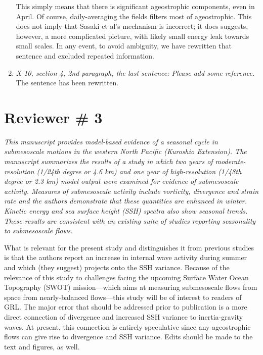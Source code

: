 \documentclass[11pt]{article}
\newcommand{\bdp}{\begin{description}}
\newcommand{\edp}{\end{description}}
\begin{document}
\begin{enumerate}
          \bdp
              This simply means that there is significant ageostrophic components,
              even in April. Of course, daily-averaging the fields filters most of
              ageostrophic. This does not imply that Sasaki et al's mechanism is
              incorrect; it does suggests, however, a more complicated picture, with
              likely small energy leak towards small scales. In any event, to avoid ambiguity, we
              have rewritten that sentence and excluded repeated information.
          \edp

  \item {\it X-10, section 4, 2nd paragraph, the last sentence: Please add some reference.}
          The sentence has been rewritten.
\end{enumerate}


\section{Reviewer \# 3}
        {\it This manuscript provides model-based evidence of a seasonal cycle in submesoscale motions
         in the western North Pacific (Kuroshio Extension). The manuscript summarizes the results of
         a study in which two years of moderate-resolution (1/24th degree or 4.6 km) and one year of
         high-resolution (1/48th degree or 2.3 km) model output were examined for evidence of
         submesoscale activity. Measures of submesoscale activity include vorticity, divergence and
         strain rate and the authors demonstrate that these quantities are enhanced in winter. Kinetic
         energy and sea surface height (SSH) spectra also show seasonal trends. These results are
         consistent with an existing suite of studies reporting seasonality to submesoscale flows.

         What is relevant for the present study and distinguishes it from previous studies is that the
         authors report an increase in internal wave activity during summer and which (they suggest)
         projects onto the SSH variance. Because of the relevance of this study to challenges facing
         the upcoming Surface Water Ocean Topography (SWOT) mission—which aims at measuring
         submesoscale flows from space from nearly-balanced flows—this study will be of interest to
         readers of GRL. The major error that should be addressed prior to publication is a more direct
         connection of divergence and increased SSH variance to inertia-gravity waves. At present,
         this connection is entirely speculative since any ageostrophic flows can give rise to
        divergence and SSH variance. Edits should be made to the text and figures, as well.}\\
\end{document}
